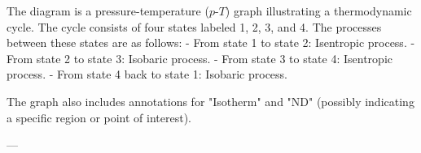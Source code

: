 The diagram is a pressure-temperature (\( p \)-\( T \)) graph illustrating a thermodynamic cycle. The cycle consists of four states labeled 1, 2, 3, and 4. The processes between these states are as follows:  
- From state 1 to state 2: Isentropic process.  
- From state 2 to state 3: Isobaric process.  
- From state 3 to state 4: Isentropic process.  
- From state 4 back to state 1: Isobaric process.  

The graph also includes annotations for "Isotherm" and "ND" (possibly indicating a specific region or point of interest).  

---